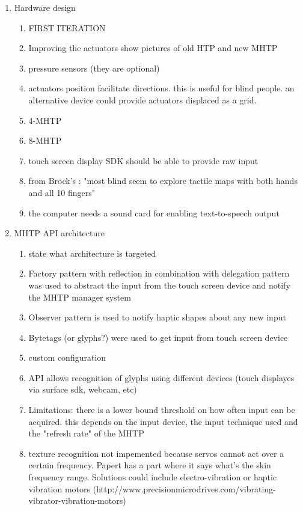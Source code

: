 \begin{enumerate}
	\item Hardware design
    	\begin{enumerate}
        \item FIRST ITERATION
        	\item Improving the actuators
            	show pictures of old HTP and new MHTP
            \item pressure sensors (they are optional)
            \item actuators position facilitate directions. this is useful for blind people. an alternative device could provide actuators displaced as a grid.
            \item 4-MHTP
            \item 8-MHTP
            \item touch screen display SDK should be able to provide raw input
            \item from Brock's : "most blind seem to explore tactile maps with both hands and all 10 fingers"
            \item the computer needs a sound card for enabling text-to-speech output
        \end{enumerate}
	\item MHTP API architecture
    	\begin{enumerate}
        	\item state what architecture is targeted
        	\item Factory pattern with reflection in combination with delegation pattern was used to abstract the input from the touch screen device and notify the MHTP manager system
            \item Observer pattern is used to notify haptic shapes about any new input
            \item Bytetags (or glyphs?) were used to get input from touch screen device
            \item custom configuration
            \item API allows recognition of glyphs using different devices (touch displayes via surface sdk, webcam, etc)
            \item Limitations: there is a lower bound threshold on how often input can be acquired. this depends on the input device, the input technique used and the "refresh rate" of the MHTP
            \item texture recognition not impemented because servos cannot act over a certain frequency. Papert \cite{brown2005first} has a part where it says what's the skin frequency range. Solutions could include electro-vibration or haptic vibration motors (http://www.precisionmicrodrives.com/vibrating-vibrator-vibration-motors)

\end{enumerate}
\end{enumerate}
